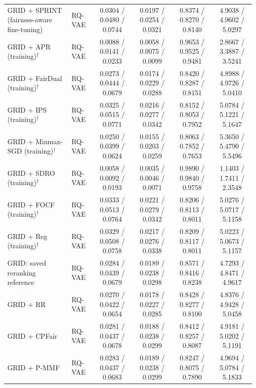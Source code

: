 \begin{table}[p]
{\begin{tabular}{llcccc}
GRID + SPRINT (fairness-aware fine-tuning) & RQ-VAE & 0.0304 / 0.0480 / 0.0744 & 0.0197 / 0.0254 / 0.0321 & 0.8374 / 0.8270 / 0.8140 & 4.9038 / 4.9602 / 5.0297 \\
GRID + APR (training)$^{\dagger}$ & RQ-VAE & 0.0088 / 0.0141 / 0.0233 & 0.0058 / 0.0075 / 0.0099 & 0.9653 / 0.9525 / 0.9481 & 2.8667 / 3.3887 / 3.5241 \\
GRID + FairDual (training)$^{\dagger}$ & RQ-VAE & 0.0273 / 0.0444 / 0.0679 & 0.0174 / 0.0229 / 0.0288 & 0.8420 / 0.8287 / 0.8151 & 4.8988 / 4.9726 / 5.0410 \\
GRID + IPS (training)$^{\dagger}$ & RQ-VAE & 0.0325 / 0.0515 / 0.0771 & 0.0216 / 0.0277 / 0.0342 & 0.8152 / 0.8053 / 0.7952 & 5.0784 / 5.1221 / 5.1647 \\
GRID + Minmax-SGD (training)$^{\dagger}$ & RQ-VAE & 0.0250 / 0.0399 / 0.0624 & 0.0155 / 0.0203 / 0.0259 & 0.8063 / 0.7852 / 0.7653 & 5.3650 / 5.4790 / 5.5496 \\
GRID + SDRO (training)$^{\dagger}$ & RQ-VAE & 0.0058 / 0.0092 / 0.0193 & 0.0035 / 0.0046 / 0.0071 & 0.9890 / 0.9840 / 0.9758 & 1.1403 / 1.7411 / 2.3548 \\
GRID + FOCF (training)$^{\dagger}$ & RQ-VAE & 0.0333 / 0.0513 / 0.0764 & 0.0221 / 0.0279 / 0.0342 & 0.8206 / 0.8113 / 0.8011 & 5.0276 / 5.0717 / 5.1158 \\
GRID + Reg (training)$^{\dagger}$ & RQ-VAE & 0.0329 / 0.0508 / 0.0758 & 0.0217 / 0.0276 / 0.0338 & 0.8209 / 0.8117 / 0.8011 & 5.0223 / 5.0673 / 5.1157 \\
GRID: saved reranking reference & RQ-VAE & 0.0284 / 0.0439 / 0.0679 & 0.0189 / 0.0238 / 0.0298 & 0.8571 / 0.8416 / 0.8238 & 4.7293 / 4.8471 / 4.9617 \\
GRID + RR & RQ-VAE & 0.0270 / 0.0422 / 0.0654 & 0.0178 / 0.0227 / 0.0285 & 0.8428 / 0.8277 / 0.8100 & 4.8376 / 4.9428 / 5.0458 \\
GRID + CPFair & RQ-VAE & 0.0281 / 0.0437 / 0.0678 & 0.0188 / 0.0238 / 0.0299 & 0.8412 / 0.8257 / 0.8087 & 4.9181 / 5.0202 / 5.1191 \\
GRID + P-MMF & RQ-VAE & 0.0283 / 0.0437 / 0.0683 & 0.0189 / 0.0238 / 0.0299 & 0.8247 / 0.8075 / 0.7890 & 4.9694 / 5.0784 / 5.1833 \\
\bottomrule
\end{tabular}%
}
\end{table}

